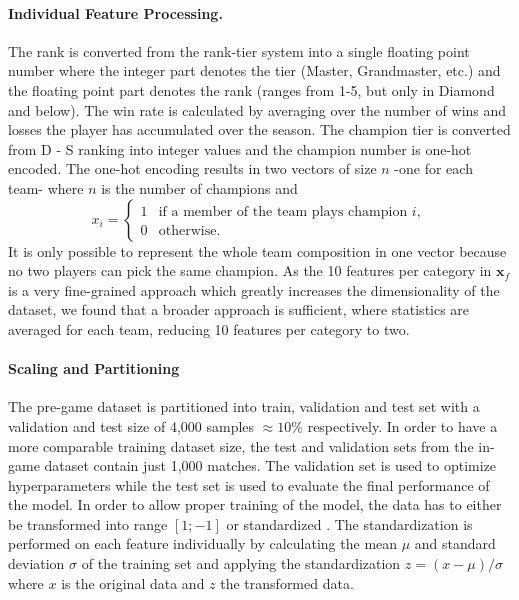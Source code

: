 \documentclass[12pt, a4paper, headinclude, twoside, plainheadsepline, open=right, numbers=noenddot, hidelinks, toc=listof, toc=bibliography]{scrreprt}
\begin{document}
\paragraph{Individual Feature Processing.}
The rank is converted from the rank-tier system into a single floating point number where the integer part denotes the tier (Master, Grandmaster, etc.) and the floating point part denotes the rank (ranges from 1-5, but only in Diamond and below).
The win rate is calculated by averaging over the number of wins and losses the player has accumulated over the season.
The champion tier is converted from D - S ranking into integer values and the champion number is one-hot encoded.
The one-hot encoding results in two vectors of size $n$ -one for each team- where $n$ is the number of champions and 
\begin{equation*}
x_i = 
\begin{cases}
	1 & \text{if a member of the team plays champion } i, \\
	0 & \text{otherwise}.
\end{cases}
\end{equation*}
It is only possible to represent the whole team composition in one vector because no two players can pick the same champion.
As the 10 features per category in $\mathbf{x}_f$ is a very fine-grained approach which greatly increases the dimensionality of the dataset, 
we found that a broader approach is sufficient, where statistics are averaged for each team, reducing 10 features per category to two.

\paragraph{Scaling and Partitioning}
The pre-game dataset is partitioned into train, validation and test set with a validation and test size of 4,000 samples $ \approx 10\%$ respectively.
In order to have a more comparable training dataset size, the test and validation sets from the in-game dataset contain just 1,000 matches.
The validation set is used to optimize hyperparameters while the test set is used to evaluate the final performance of the model.
In order to allow proper training of the model, the data has to either be transformed into range $[1;-1]$ or standardized \cite{shankerEffectDataStandardization1996}.
The standardization is performed on each feature individually by calculating the mean $\mu$ and standard deviation $\sigma$ of the training set and applying the standardization $z = (x - \mu) / \sigma$ where $x$ is the original data and $z$ the transformed data.
\end{document}
